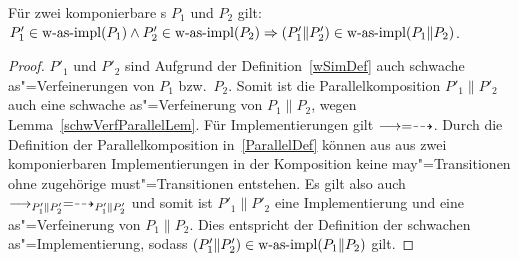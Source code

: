 \begin{Kor}
  \label{schwImpParallelKor}
  Für zwei komponierbare \MEIO{}s $P_1$ und $P_2$ gilt:
  $P'_1\in\mathrm{w}\text{-}\mathrm{as}\text{-}\mathrm{impl} (P_1) \land P'_2 \in\mathrm{w}\text{-}\mathrm{as}\text{-}\mathrm{impl} (P_2) \Rightarrow (P'_1\|P'_2)
  \in\mathrm{w}\text{-}\mathrm{as}\text{-}\mathrm{impl} (P_1\|P_2)$.
\end{Kor}
\begin{proof}
  $P'_1$ und $P'_2$ sind Aufgrund der Definition~\ref{wSimDef} auch schwache
  as"=Verfeinerungen von $P_1$ bzw.\ $P_2$. Somit ist die Parallelkomposition
  $P'_1\|P'_2$ auch eine schwache as"=Verfeinerung von $P_1\|P_2$, wegen
  Lemma~\ref{schwVerfParallelLem}. Für Implementierungen gilt $\must =\may$.
  Durch die Definition der Parallelkomposition in~\ref{ParallelDef} können aus
  aus zwei komponierbaren Implementierungen in der Komposition keine
  may"=Transitionen ohne zugehörige must"=Transitionen entstehen. Es gilt also
  auch $\must _{P'_1\|P'_2} =\may _{P'_1\|P'_2}$ und somit ist $P'_1\|P'_2$
  eine Implementierung und eine as"=Verfeinerung von $P_1\|P_2$. Dies
  entspricht der Definition der schwachen as"=Implementierung, sodass
  $(P'_1\|P'_2)\in\mathrm{w}\text{-}\mathrm{as}\text{-}\mathrm{impl} (P_1\|P_2)$ gilt.
\end{proof}

